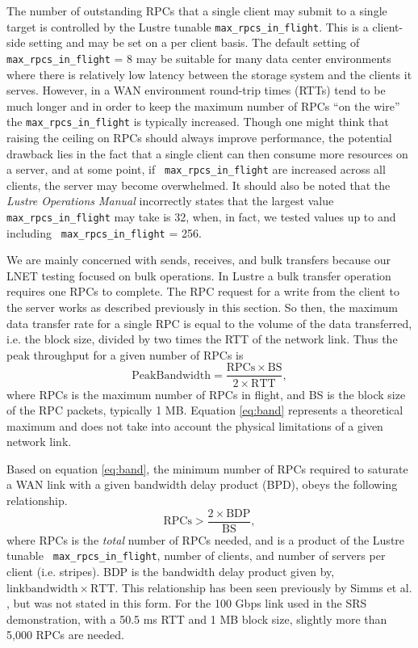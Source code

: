 \documentclass[]{sigplan-proc}
\begin{document}
The number of outstanding RPCs that a single client may submit to a single target is controlled by the
Lustre tunable {\tt max\_rpcs\_in\_flight}. This is a client-side setting and may be set on a per client
basis. The default setting of {\tt max\_rpcs\_in\_flight} = 8 may be suitable for many data center
environments where there is relatively low latency between the storage system and the clients it
serves. However, in a WAN environment round-trip times (RTTs) tend to be much longer and in order to keep the
maximum number of RPCs ``on the wire'' the {\tt max\_rpcs\_in\_flight} is typically increased. Though one
might think that raising the ceiling on RPCs should always improve performance, the potential drawback lies in
the fact that a single client can then consume more resources on a server, and at some point, if {\tt
  max\_rpcs\_in\_flight} are increased across all clients, the server may become overwhelmed. It should also
be noted that the {\it Lustre Operations Manual} \cite{LustreManual2012} incorrectly states that the largest
value {\tt max\_rpcs\_in\_flight} may take is 32, when, in fact, we tested values up to and including {\tt
  max\_rpcs\_in\_flight} = 256.

We are mainly concerned with sends, receives, and bulk transfers because our LNET testing focused on bulk
operations. In Lustre a bulk transfer operation requires one RPCs to complete. The RPC request for a write
from the client to the server works as described previously in this section. So then, the maximum data
transfer rate for a single RPC is equal to the volume of the data transferred, i.e. the block size, divided by
two times the RTT of the network link. Thus the peak throughput for a given number of RPCs is
\begin{equation}
\mathrm{Peak Bandwidth = \frac{RPCs \times BS}{2 \times RTT}},
\label{eq:band}
\end{equation}
where RPCs is the maximum number of RPCs in flight, and BS is the block size of the RPC packets, typically 1
MB. Equation \ref{eq:band} represents a theoretical maximum and does not take into account the physical
limitations of a given network link.

Based on equation \ref{eq:band}, the minimum number of RPCs required to saturate a WAN link with a given
bandwidth delay product (BPD), obeys the following relationship.
\begin{equation}
\mathrm{RPCs > \frac{2\times BDP}{BS},}
\label{eq:rpcs}
\end{equation}
where RPCs is the {\it total} number of RPCs needed, and is a product of the Lustre tunable {\tt
  max\_rpcs\_in\_flight}, number of clients, and number of servers per client (i.e. stripes). BDP is the
bandwidth delay product given by, $\mathrm{link bandwidth \times RTT}$. This relationship has been seen
previously by Simms et al. \cite{simms2007}, but was not stated in this form. For the 100 Gbps link used in
the SRS demonstration, with a 50.5 ms RTT and 1 MB block size, slightly more than 5,000 RPCs are needed.
\end{document}
